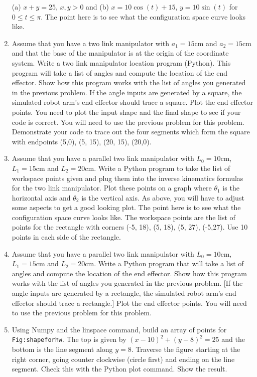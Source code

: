 \begin{enumerate}
  (a) \(x+y = 25\), \(x, y >0\) and (b) \(x = 10\cos (t) + 15\),
  \(y = 10\sin (t)\) for \(0 \leq t \leq \pi\). The point here is to see
  what the configuration space curve looks like.
\item
  Assume that you have a two link manipulator with \(a_1 = 15\)cm and
  \(a_2 = 15\)cm and that the base of the manipulator is at the origin
  of the coordinate system. Write a two link manipulator location
  program (Python). This program will take a list of angles and compute
  the location of the end effector. Show how this program works with the
  list of angles you generated in the previous problem. If the angle
  inputs are generated by a square, the simulated robot arm's end
  effector should trace a square. Plot the end effector points. You need
  to plot the input shape and the final shape to see if your code is
  correct. You will need to use the previous problem for this problem.
  Demonstrate your code to trace out the four segments which form the
  square with endpoints (5,0), (5, 15), (20, 15), (20,0).
\item
  Assume that you have a parallel two link manipulator with
  \(L_0 = 10\)cm, \(L_1 = 15\)cm and \(L_2 = 20\)cm. Write a Python
  program to take the list of workspace points given and plug them into
  the inverse kinematics formulas for the two link manipulator. Plot
  these points on a graph where \(\theta_1\) is the horizontal axis and
  \(\theta_2\) is the vertical axis. As above, you will have to adjust
  some aspects to get a good looking plot. The point here is to see what
  the configuration space curve looks like. The workspace points are the
  list of points for the rectangle with corners (-5, 18), (5, 18), (5,
  27), (-5,27). Use 10 points in each side of the rectangle.
\item
  Assume that you have a parallel two link manipulator with
  \(L_0 = 10\)cm, \(L_1 = 15\)cm and \(L_2 = 20\)cm. Write a Python
  program that will take a list of angles and compute the location of
  the end effector. Show how this program works with the list of angles
  you generated in the previous problem. {[}If the angle inputs are
  generated by a rectangle, the simulated robot arm's end effector
  should trace a rectangle.{]} Plot the end effector points. You will
  need to use the previous problem for this problem.
\item
  Using Numpy and the linspace command, build an array of points for
  \texttt{Fig:shapeforhw}. The top is given by
  \((x-10)^2 + (y-8)^2 = 25\) and the bottom is the line segment along
  \(y=8\). Traverse the figure starting at the right corner, going
  counter clockwise (circle first) and ending on the line segment. Check
  this with the Python plot command. Show the result.


\end{enumerate}
